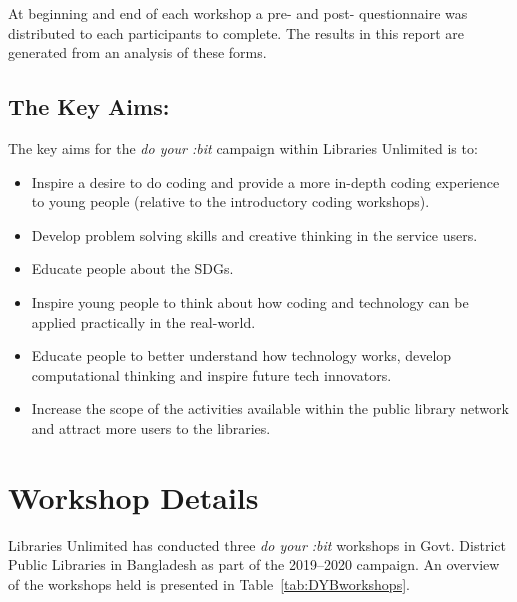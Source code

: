 \documentclass[12pt]{report} %
\newcommand{\DYB}{\textit{do your :bit }}
\begin{document}
At beginning and end of each workshop a pre- and post- questionnaire was distributed to each participants to complete. The results in this report are generated from an analysis of these forms.



\subsection{The Key Aims:}

The key aims for the \DYB campaign within Libraries Unlimited is to:
\begin{itemize}
\item Inspire a desire to do coding and provide a more in-depth coding experience to young people (relative to the introductory coding workshops).
\item Develop problem solving skills and creative thinking in the service users.
\item Educate people about the SDGs.
\item Inspire young people to think about how coding and technology can be applied practically in the real-world.
\item Educate people to better understand how technology works, develop computational thinking and inspire future tech innovators.
\item Increase the scope of the activities available within the public library network and attract more users to the libraries.
\end{itemize}


\section{Workshop Details} %

Libraries Unlimited has conducted three \DYB workshops in Govt. District Public Libraries in Bangladesh as part of the 2019--2020 campaign. An overview of the workshops held is presented in Table~\ref{tab:DYBworkshops}.%
\end{document}
